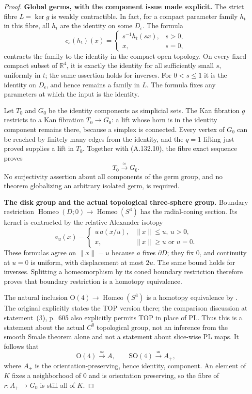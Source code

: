 \begin{proof}
\smallskip\noindent
\textbf{Global germs, with the component issue made explicit.}
The strict fibre $L=\ker g$ is weakly contractible. In fact, for
a compact parameter family $h_t$ in this fibre, all $h_t$ are the
identity on some $D_\epsilon$. The formula
\[
 c_s(h_t)(x)=
 \begin{cases}s^{-1}h_t(sx),&s>0,\\x,&s=0,\end{cases}
                                                        \tag{A.132.10}
\]
contracts the family to the identity in the compact-open topology.
On every fixed compact subset of $\mathbb R^4$, it is exactly the
identity for all sufficiently small $s$, uniformly in $t$; the
same assertion holds for inverses. For $0<s\leq1$ it is the
identity on $D_\epsilon$, and hence remains a family in $L$.
The formula fixes any parameters at which the input is the identity.

Let $T_0$ and $G_0$ be the identity components as simplicial sets.
The Kan fibration $g$ restricts to a Kan fibration
$T_0\to G_0$: a lift whose horn is in the identity component
remains there, because a simplex is connected. Every vertex of
$G_0$ can be reached by finitely many edges from the identity,
and the $q=1$ lifting just proved supplies a lift in $T_0$.
Together with (A.132.10), the fibre exact sequence proves
\[
 T_0\xrightarrow{\simeq}G_0.
                                                        \tag{A.132.11}
\]
No surjectivity assertion about all components of the germ group,
and no theorem globalizing an arbitrary isolated germ, is required.

\smallskip\noindent
\textbf{The disk group and the actual topological three-sphere group.}
Boundary restriction
$\operatorname{Homeo}(D;0)\to\operatorname{Homeo}(S^3)$ has the
radial-coning section. Its kernel is contracted by the relative
Alexander isotopy
\[
 a_u(x)=
 \begin{cases}u\,a(x/u),&\|x\|\leq u,\ u>0,\\
 x,&\|x\|\geq u\text{ or }u=0.
 \end{cases}
\]
These formulas agree on $\|x\|=u$ because $a$ fixes $\partial D$;
they fix $0$, and continuity at $u=0$ is uniform, with displacement
at most $2u$. The same bound holds for inverses. Splitting a
homeomorphism by its coned boundary restriction therefore proves
that boundary restriction is a homotopy equivalence.

The natural inclusion
$\mathrm O(4)\to\operatorname{Homeo}(S^3)$ is a homotopy
equivalence by \cite[Appendix, statement~(16), p.~606]{Hatcher1983}.
The original explicitly states the TOP version there; the
comparison discussion at statement~(3), p.~605 also explicitly
permits TOP in place of PL. Thus this is a statement about the
actual $C^0$ topological group, not an inference from the smooth
Smale theorem alone and not a statement about slice-wise PL maps.
It follows that
\[
 \mathrm O(4)\xrightarrow{\simeq}A,
 \qquad \mathrm{SO}(4)\xrightarrow{\simeq}A_+,
                                                        \tag{A.132.12}
\]
where $A_+$ is the orientation-preserving, hence identity,
component. An element of $K$ fixes a neighborhood of $0$ and is
orientation preserving, so the fibre of $r:A_+\to G_0$ is still
all of $K$.


\end{proof}
